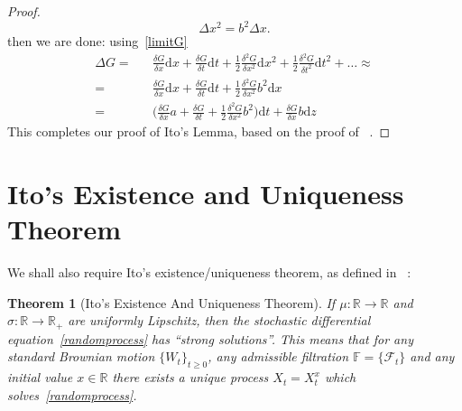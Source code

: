 \documentclass[11pt]{article} %
\newtheorem{theorem}{Theorem}[section]
\begin{document}
\begin{proof}
\[\Delta x^2 = b^2\Delta x.\]
 then we are done: using~\eqref{limitG} 
\begin{align}
    \Delta G =&& \frac{\delta G}{\delta x} \mathrm{d} x + 
    \frac{\delta G}{\delta t} \mathrm{d} t + 
    \frac{1}{2} \frac{\delta^2 G}{\delta x^2} \mathrm{d} x^2 + 
    \frac{1}{2} \frac{\delta^2 G}{\delta t^2} \mathrm{d} t^2 + \dots \approx \\
    =&& \frac{\delta G}{\delta x} \mathrm{d} x + 
    \frac{\delta G}{\delta t} \mathrm{d} t + 
    \frac{1}{2} \frac{\delta^2 G}{\delta x^2} b^2 \mathrm{d} x\\
    =&& \bigg(\frac{\delta G}{\delta x}a+ \frac{\delta G}{\delta t} + \frac{1}{2} 
    \frac{\delta^2 G}{\delta x^2} b^2 \bigg)\mathrm{d}t + \frac{\delta G}{\delta x} 
    b \mathrm{d}z
\end{align}
This completes our proof of Ito's Lemma, based on the proof of 
~\cite{optionsderivatives}.
\end{proof}
\section{Ito's Existence and Uniqueness Theorem}
We shall also require Ito's existence/uniqueness theorem, as defined in 
~\cite{SDE}:

\begin{theorem}[Ito's Existence And Uniqueness Theorem]\label{isosexistence}
    If $\mu : \mathbb{R} \to \mathbb{R}$ and $\sigma : \mathbb{R} \to \mathbb{R}_+$ 
    are uniformly Lipschitz, then the stochastic differential equation~\eqref{randomprocess} has 
    ``strong solutions''. This means that for any standard 
    Brownian motion ${\{W_t\}}_{t\geq0}$, any admissible filtration $\mathbb{F} = 
    \{\mathcal{F}_t\}$ and any initial value $x \in \mathbb{R}$ there exists a 
    unique process $X_t = X_t^x$ which solves~\eqref{randomprocess}. 

    
\end{theorem}
\end{document}
